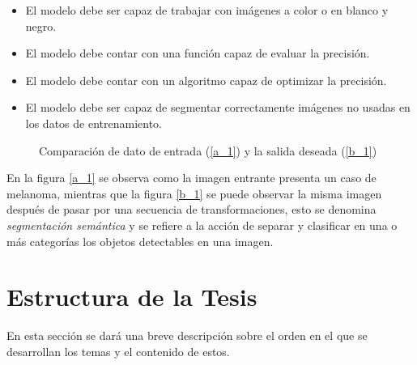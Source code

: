 \begin{itemize}
    \item El modelo debe ser capaz de trabajar con imágenes a color o en blanco y negro.
    \item El modelo debe contar con una función capaz de evaluar la precisión.
    \item El modelo debe contar con un algoritmo capaz de optimizar la precisión.
    \item El modelo debe ser capaz de segmentar correctamente imágenes no usadas en los datos de entrenamiento.
\end{itemize}

\begin{figure}[!htp]
    \centering
    \qquad
    \caption{Comparación de dato de entrada (\ref{a_1}) y la salida deseada (\ref{b_1})}
    \label{data_1}
\end{figure}

En la figura \ref{a_1} se observa como la imagen entrante presenta un caso de melanoma, mientras que la figura \ref{b_1} se puede observar la misma imagen después de pasar por una secuencia de transformaciones, esto se denomina \emph{segmentación semántica} y se refiere a la acción de separar y clasificar en una o más categorías los objetos detectables en una imagen.

\section{Estructura de la Tesis}
En esta sección se dará una breve descripción sobre el orden en el que se desarrollan los temas y el contenido de estos.

